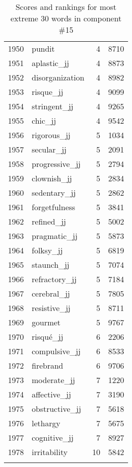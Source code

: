 \begin{longtable}[!htbp]{| rlr@{.}l |}
    1950 & pundit & 4 & 8710 \\
    1951 & aplastic\_jj & 4 & 8873 \\
    1952 & disorganization & 4 & 8982 \\
    1953 & risque\_jj & 4 & 9099 \\
    1954 & stringent\_jj & 4 & 9265 \\
    1955 & chic\_jj & 4 & 9542 \\
    1956 & rigorous\_jj & 5 & 1034 \\
    1957 & secular\_jj & 5 & 2091 \\
    1958 & progressive\_jj & 5 & 2794 \\
    1959 & clownish\_jj & 5 & 2834 \\
    1960 & sedentary\_jj & 5 & 2862 \\
    1961 & forgetfulness & 5 & 3841 \\
    1962 & refined\_jj & 5 & 5002 \\
    1963 & pragmatic\_jj & 5 & 5873 \\
    1964 & folksy\_jj & 5 & 6819 \\
    1965 & staunch\_jj & 5 & 7074 \\
    1966 & refractory\_jj & 5 & 7184 \\
    1967 & cerebral\_jj & 5 & 7805 \\
    1968 & resistive\_jj & 5 & 8711 \\
    1969 & gourmet & 5 & 9767 \\
    1970 & risqué\_jj & 6 & 2206 \\
    1971 & compulsive\_jj & 6 & 8533 \\
    1972 & firebrand & 6 & 9706 \\
    1973 & moderate\_jj & 7 & 1220 \\
    1974 & affective\_jj & 7 & 3190 \\
    1975 & obstructive\_jj & 7 & 5618 \\
    1976 & lethargy & 7 & 5675 \\
    1977 & cognitive\_jj & 7 & 8927 \\
    1978 & irritability & 10 & 5842 \\
    \hline
    \caption{Scores and rankings for most extreme 30 words in component \#15} \\
\end{longtable}

